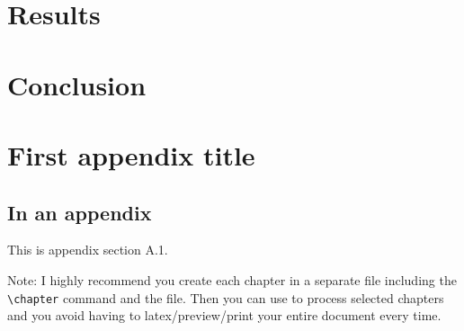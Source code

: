 \documentclass[11pt]{afthesis}
\begin{document}
	

	
	
	
	
	
	
	
	\chapter{Results}
	
	\chapter{Conclusion}
	
	
	\appendix		%
	
	\chapter{First appendix title}
	
	\section{In an appendix} 
	
	This is appendix section A.1.
	
	Note: I highly recommend you create each chapter in a separate file
	including the \verb|\chapter| command and \verb|| the file.
	Then you can use \verb|| to process selected chapters and
	you avoid having to latex/preview/print your entire document every
	time.
	
	
\end{document}
